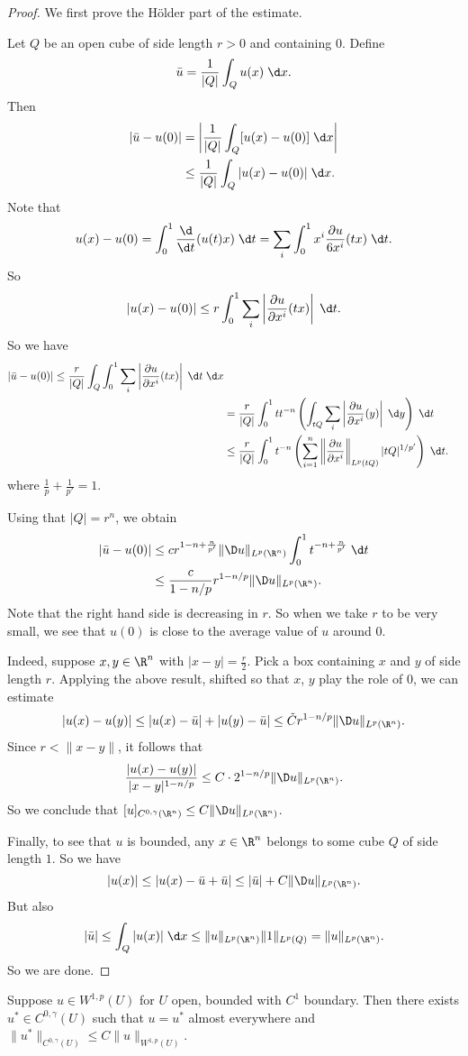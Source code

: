 \documentclass[a4paper]{article}
\begin{document}
\begin{proof}
  We first prove the H\"older part of the estimate.

  Let $Q$ be an open cube of side length $r > 0$ and containing $0$. Define
  \[
    \bar{u} = \frac{1}{|Q|} \int_Q u(x)\;\d x.
  \]
  Then
  \begin{align*}
    |\bar{u} - u(0)| &= \left|\frac{1}{|Q|} \int_Q [u(x) - u(0)]\;\d x\right|\\
    &\leq \frac{1}{|Q|} \int_Q |u(x) - u(0)|\;\d x.
  \end{align*}
  Note that
  \[
    u(x) - u(0) = \int_0^1 \frac{\d}{\d t} (u(t)x)\;\d t = \sum_i \int_0^1 x^i \frac{\partial u}{6 x^i} (tx)\;\d t.
  \]
  So
  \[
    |u(x) - u(0)| \leq r \int_0^1 \sum_i \left|\frac{\partial u}{\partial x^i} (tx)\right|\;\d t.
  \]
  So we have
  \begin{align*}
    |\bar{u} - u(0)| \leq \frac{r}{|Q|} \int_Q \int_0^1 \sum_i \left|\frac{\partial u}{\partial x^i}(tx)\right|\;\d t\;\d x\\
    &= \frac{r}{|Q|} \int_0^1 tt^{-n} \left(\int_{tQ} \sum_i \left|\frac{\partial u}{\partial x^i} (y)\right|\;\d y \right)\;\d t\\
    &\leq \frac{r}{|Q|} \int_0^1 t^{-n} \left(\sum_{i = 1}^n \left\|\frac{\partial u}{\partial x^i}\right\|_{L^p(tQ)} |tQ|^{1/p'}\right)\;\d t.
  \end{align*}
  where $\frac{1}{p} + \frac{1}{p'} = 1$.

  Using that $|Q| = r^n$, we obtain
  \begin{align*}
    |\bar{u} - u(0)| &\leq c r^{1 -n + \frac{n}{p'}} \|\D u\|_{L^p(\R^n)} \int_0^1 t^{-n + \frac{n}{p'}} \;\d t\\
    &\leq \frac{c}{1 - n/p} r^{1 - n/p} \|\D u\|_{L^p(\R^n)}.
  \end{align*}
  Note that the right hand side is decreasing in $r$. So when we take $r$ to be very small, we see that $u(0)$ is close to the average value of $u$ around $0$.

  Indeed, suppose $x, y \in \R^n$ with $|x - y| = \frac{r}{2}$. Pick a box containing $x$ and $y$ of side length $r$. Applying the above result, shifted so that $x$, $y$ play the role of $0$, we can estimate
  \[
    |u(x) - u(y)| \leq |u(x) - \bar{u}| + |u(y) - \bar{u}| \leq \tilde{C} r^{1 - n/p} \|\D u\|_{L^p(\R^n)}.
  \]
  Since $r < \|x - y\|$, it follows that
  \[
    \frac{|u(x) - u(y)|}{|x - y|^{1 - n/p}} \leq C \cdot 2^{1 - n/p} \|\D u\|_{L^p(\R^n)}.
  \]
  So we conclude that $[u]_{C^{0, \gamma}(\R^n)} \leq C \|\D u\|_{L^p(\R^n)}$.

  Finally, to see that $u$ is bounded, any $x \in \R^n$ belongs to some cube $Q$ of side length $1$. So we have
  \[
    |u(x)| \leq |u(x) - \bar{u} + \bar{u}| \leq |\bar{u}| + C \|\D u\|_{L^p(\R^n)}.
  \]
  But also
  \[
    |\bar{u}| \leq \int_Q |u(x)|\;\d x \leq \|u\|_{L^p(\R^n)} \|1\|_{L^p(Q)} = \|u\|_{L^p(\R^n)}.
  \]
  So we are done.
\end{proof}

\begin{cor}
  Suppose $u \in W^{1, p}(U)$ for $U$ open, bounded with $C^1$ boundary. Then there exists $u^* \in C^{0, \gamma}(U)$ such that $u = u^*$ almost everywhere and $\|u^*\|_{C^{0, \gamma}(U)} \leq C\|u\|_{W^{1, p}(U)}$.
\end{cor}


\printindex
\end{document}
